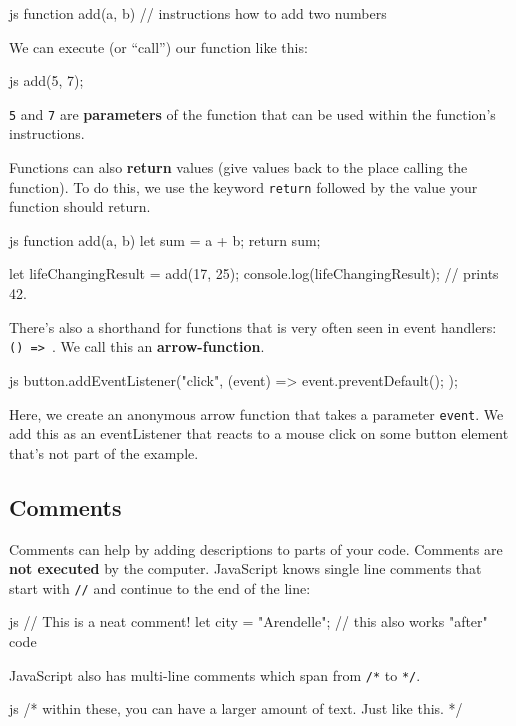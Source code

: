 \documentclass[10pt,a4paper]{article}
\begin{document}
\begin{multicols}{3}
\begin{codebox}{js}{}
  function add(a, b) {
    // instructions how to add two numbers
  }
\end{codebox}
We can execute (or \enquote{call}) our function like this:
\begin{codebox}{js}{}
  add(5, 7);
\end{codebox}
\texttt{5} and \texttt{7} are \textbf{parameters} of the function that can be used within the function's instructions.

Functions can also \textbf{return} values (give values back to the place calling the function). To do this, we use the keyword \texttt{return} followed by the value your function should return.

\begin{codebox}{js}{}
  function add(a, b) {
    let sum = a + b;
    return sum;
  }
  
  let lifeChangingResult = add(17, 25);
  console.log(lifeChangingResult); // prints 42.
\end{codebox}

There's also a shorthand for functions that is very often seen in event handlers: \texttt{() => {}}. We call this an \textbf{arrow-function}.
\begin{codebox}{js}{}
  button.addEventListener("click", (event) => {
    event.preventDefault();
  });
\end{codebox}
Here, we create an anonymous arrow function that takes a parameter \texttt{event}. We add this as an eventListener that reacts to a mouse click on some button element that's not part of the example.

\subsection*{Comments}
Comments can help by adding descriptions to parts of your code. Comments are \textbf{not executed} by the computer. JavaScript knows single line comments that start with \texttt{//} and continue to the end of the line:
\begin{codebox}{js}{}
  // This is a neat comment!
  let city = "Arendelle"; // this also works "after" code
\end{codebox}

JavaScript also has multi-line comments which span from \texttt{/*} to \texttt{*/}.
\begin{codebox}{js}{}
  /* within these, you can have a
     larger amount of text.
     Just like this. */
\end{codebox}


\end{multicols}
\end{document}
